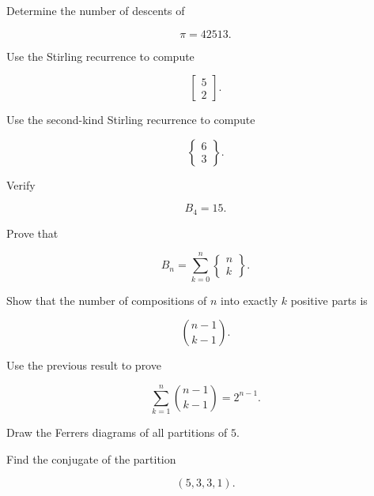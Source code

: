 \begin{exercise}[1]
Determine the number of descents of

\[
\pi=42513.
\]
\end{exercise}

\begin{exercise}[2]
Use the Stirling recurrence to compute

\[
\left[
\begin{matrix}
5\\
2
\end{matrix}
\right].
\]
\end{exercise}

\begin{exercise}[2]
Use the second-kind Stirling recurrence to compute

\[
\left\{
\begin{matrix}
6\\
3
\end{matrix}
\right\}.
\]
\end{exercise}

\begin{exercise}[2]
Verify

\[
B_4=15.
\]
\end{exercise}

\begin{exercise}[2]
Prove that

\[
B_n
=
\sum_{k=0}^{n}
\left\{
\begin{matrix}
n\\
k
\end{matrix}
\right\}.
\]
\end{exercise}

\begin{exercise}[2]
Show that the number of compositions of \(n\) into exactly \(k\)
positive parts is

\[
\binom{n-1}{k-1}.
\]
\end{exercise}

\begin{exercise}[2]
Use the previous result to prove

\[
\sum_{k=1}^{n}
\binom{n-1}{k-1}
=
2^{n-1}.
\]
\end{exercise}

\begin{exercise}[2]
Draw the Ferrers diagrams of all partitions of \(5\).
\end{exercise}

\begin{exercise}[2]
Find the conjugate of the partition

\[
(5,3,3,1).
\]
\end{exercise}

